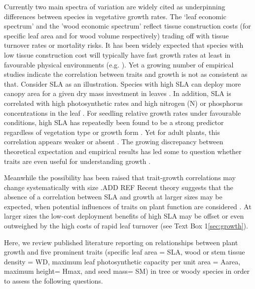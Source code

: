 \documentclass[a4paper]{article}\usepackage[]{graphicx}\usepackage[]{color}
\begin{document}
Currently two main spectra of variation are widely cited as underpinning differences between species in vegetative growth rates. The `leaf economic spectrum' \citep{Wright:2004jb} and the 'wood economic spectrum' \citep{Chave:2009iy} reflect tissue construction costs (for specific leaf area and for wood volume respectively) trading off with tissue turnover rates or mortality risks. It has been widely expected that species with low tissue construction cost will typically have fast growth rates at least in favourable physical environments (e.g. \citealt{MullerLandau:2004dc,Wright:2004jb,Poorter:2008iu,Chave:2009iy,Larjavaara:2010bn,Iida:2012jb,Paine:2015df}). Yet a growing number of empirical studies indicate the correlation between traits and growth is not as consistent as that. Consider SLA as an illustration. Species with high SLA can deploy more canopy area for a given dry mass investment in leaves \citep{Poorter:1999wd, Reich:1992wm}. In addition, SLA is correlated with high photosynthetic rates and high nitrogen (N) or phosphorus concentrations in the leaf \citep{Wright:2004jb}. For seedling relative growth rates under favourable conditions, high SLA has repeatedly been found to be a strong predictor regardless of vegetation type or growth form \citep{Lambers:1992bj,Reich:1992wm,Grime:1997wm,Poorter:1999wd,Wright:1999ds}. Yet for adult plants, this correlation appears weaker or absent \citep{coomes_comparison_1998,Poorter:2008iu,Aiba:2009ft,Easdale:2009gv,Wright:2010tp}. The growing discrepancy between theoretical expectation and empirical results has led some to question whether traits are even useful for understanding growth \citep{Wright:2010tp, Paine:2015df}.

Meanwhile the possibility has been raised that trait-growth correlations may change systematically with size \citep{Falster:2011ii, Ruger:2012jv, Iida:2014ep, Iida:2014hq}.ADD REF  Recent theory suggests that the absence of a correlation between SLA and growth at larger sizes may be expected, when potential influences of traits on plant function are considered \citep{Falster:2011ii, falster:2013}. At larger sizes the low-cost deployment benefits of high SLA may be offset or even outweighed by the high costs of rapid leaf turnover (see Text Box 1\ref{sec:growth}). 

Here, we review published literature reporting on relationships between plant growth and five prominent traits (specific leaf area = SLA, wood or stem tissue density = WD, maximum leaf photosynthetic capacity per unit area = Aarea,  maximum height= Hmax, and seed mass= SM) in tree or woody species in order to assess the following questions. 
\end{document}

